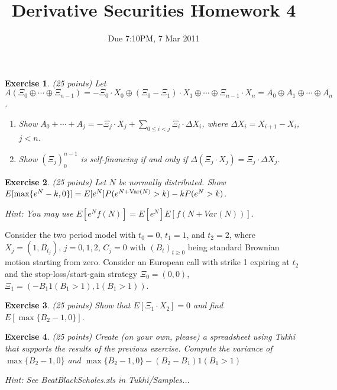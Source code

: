 \documentclass[11pt,fleqn]{amsproc}
\newcommand{\Var}{\mathop{\rm{Var}}}
\newtheorem{xca}{Exercise}
\begin{document}
\title{Derivative Securities Homework 4}
\author{Due 7:10PM, 7 Mar 2011}

\maketitle

\begin{xca}{(25 points)}
Let $A(\Xi_0\oplus\cdots\oplus\Xi_{n-1}) = -\Xi_0\cdot X_0
\oplus (\Xi_0 - \Xi_1)\cdot X_1\oplus\cdots\oplus \Xi_{n-1}\cdot X_n
= A_0\oplus A_1\oplus\cdots\oplus A_n$.
\begin{enumerate}
\item Show $A_0 + \cdots + A_j = -\Xi_j\cdot X_j +
\sum_{0\le i < j}\Xi_i\cdot\Delta X_i$, where
$\Delta X_i = X_{i+1} - X_i$, $j < n$. 

\item Show $(\Xi_j)_0^{n-1}$ is self-financing if and only if
$\Delta (\Xi_j\cdot X_j) = \Xi_j\cdot \Delta X_j$.

\end{enumerate}

\end{xca}

\begin{xca}{(25 points)}
Let $N$ be normally distributed. Show $E[\max\{e^N - k, 0\}]
= E[e^N]P(e^{N + \Var(N)} > k) - k P(e^N > k)$.

Hint: You may use $E[e^N f(N)] = E[e^N] E[f(N + Var(N))]$.

\end{xca}

Consider the two period model with $t_0 = 0$, $t_1 = 1$, and $t_2 = 2$,
where $X_j = (1, B_{t_j})$, $j = 0, 1, 2$, $C_j = 0$ with $(B_t)_{t\ge0}$
being standard Brownian motion starting from zero. Consider an European
call with strike 1 expiring at $t_2$ and the stop-loss/start-gain strategy
$\Xi_0 = (0, 0)$, $\Xi_1 = (-B_1 1(B_1 > 1), 1(B_1 > 1))$.

\begin{xca}{(25 points)}
Show that $E[\Xi_1\cdot X_2] = 0$ and find
$E[\max\{B_2 - 1, 0\}]$.

\end{xca}

\begin{xca}{(25 points)}
Create (on your own, please) a spreadsheet using Tukhi
that supports the results of the previous exercise.
Compute the variance of $\max\{B_2 - 1, 0\}$ and
$\max\{B_2 - 1, 0\} - (B_2 - B_1)1(B_1 > 1)$

Hint: See BeatBlackScholes.xls in Tukhi/Samples...

\end{xca}
\end{document}
